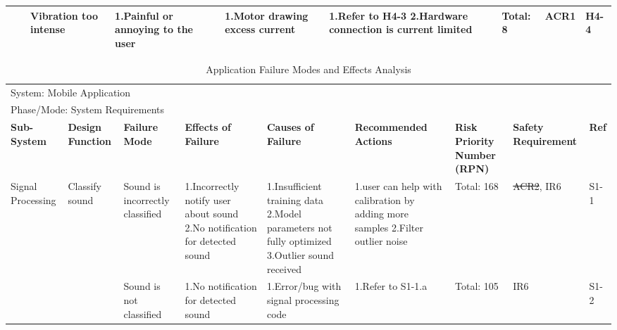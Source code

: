 \documentclass{article}
\begin{document}
\begin{landscape}
\begin{table}[H]
\begin{tabular}{| p{} | p{}  | p{} | p{} | p{} | p{} | p{} | p{} | p{} |}
     & & Vibration too intense & 1.Painful or annoying to the user & 1.Motor drawing excess current & 1.Refer to H4-3 \newline 2.Hardware connection is current limited & Total: 8 & ACR1 & H4-4 \\ \hline
 
    \end{tabular}
    \hspace*{-1cm}
    \end{table}
    

\newpage

\begin{table}[H]

    \caption{Application Failure Modes and Effects Analysis}
    \scriptsize	
    \centering
    \hspace*{-2.2cm}
    \begin{tabular}{| p{} | p{}  | p{} | p{} | p{} | p{} | p{} | p{} | p{} |}
     \hline
    
    \multicolumn{9}{|l|}{System: Mobile Application } \\
    \multicolumn{9}{|l|}{Phase/Mode: System Requirements} \\ \hline
    \textbf{Sub-System} & \textbf{Design Function} & \textbf{Failure Mode} & \textbf{Effects of Failure} & \textbf{Causes of Failure} & \textbf{Recommended Actions} & \textbf{Risk Priority Number (RPN)} & \textbf{Safety Requirement} & \textbf{Ref} \\ \hline

    Signal Processing & Classify sound & Sound is incorrectly classified & 1.Incorrectly notify user about sound \newline 2.No notification for detected sound & 1.Insufficient training data \newline 2.Model parameters not fully optimized \newline 3.Outlier sound received  & 1.user can help with calibration by adding more samples \newline 2.Filter outlier noise  & Total: 168 & \sout{ACR2}, IR6 & S1-1 \\ \cline{3-9}
    
     & & Sound is not classified & 1.No notification for detected sound & 1.Error/bug with signal processing code & 1.Refer to S1-1.a & Total: 105 & IR6 & S1-2 \\ \hline


\end{tabular}
\end{table}
\end{landscape}
\end{document}

